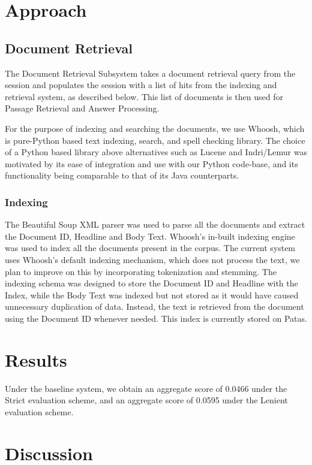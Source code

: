 \documentclass[11pt]{article}
\begin{document}
\section{Approach}
\subsection{Document Retrieval}
The Document Retrieval Subsystem takes a document retrieval query from the session and populates the session with a list of hits from the indexing and retrieval system, as described below. This list of documents is then used for Passage Retrieval and Answer Processing.

For the purpose of indexing and searching the documents, we use Whoosh\cite{whoosh}, which is pure-Python based text indexing, search, and spell checking library. The choice of a Python based library above alternatives such as Lucene and Indri/Lemur was motivated by its ease of integration and use with our Python code-base, and its functionality being comparable to that of its Java counterparts. 

\subsubsection{Indexing}
The Beautiful Soup XML parser\cite{bsoup} was used to parse all the documents and extract the Document ID, Headline and Body Text. Whoosh's in-built indexing engine was used to index all the documents present in the corpus. The current system uses Whoosh's default indexing mechanism, which does not process the text, we plan to improve on this by incorporating tokenization and stemming. The indexing schema was designed to store the Document ID and Headline with the Index, while the Body Text was indexed but not stored as it would have caused unnecessary duplication of data. Instead, the text is retrieved from the document using the Document ID whenever needed. This index is currently stored on Patas.

\section{Results}

Under the baseline system, we obtain an aggregate score of 0.0466 under the Strict evaluation scheme, and an aggregate score of 0.0595 under the Lenient evaluation scheme.

\section{Discussion}
\label{sec:discussion}
\end{document}

